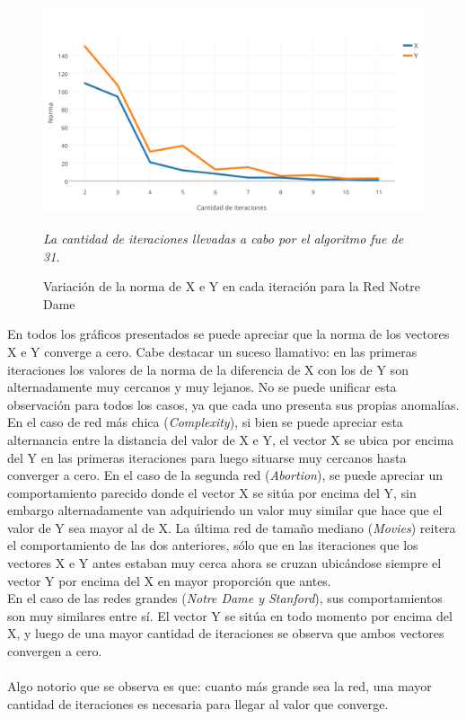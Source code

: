 \documentclass[a4paper]{article}
\begin{document}
\begin{figure}[h!]
  \begin{center}
	\includegraphics[scale=0.50]{imagenes/exp12/notredameHITS.png}
	\caption{Variaci\'on de la norma de X e Y en cada iteraci\'on para la Red Notre Dame}
	\label{nombreparareferenciar}
	\textit{La cantidad de iteraciones llevadas a cabo por el algoritmo fue de 31.}
  \end{center}
\end{figure}
\indent En todos los gr\'aficos presentados se puede apreciar que la norma de los vectores X e Y converge a cero. Cabe destacar un suceso llamativo: en las primeras iteraciones los valores de la norma de la diferencia de X con los de Y son alternadamente muy cercanos y muy lejanos. No se puede unificar esta observaci\'on para todos los casos, ya que cada uno presenta sus propias anomal\'ias. \\
\indent En el caso de red m\'as chica (\emph{Complexity}), si bien se puede apreciar esta alternancia entre la distancia del valor de X e Y, el vector X se ubica por encima del Y en las primeras iteraciones para luego situarse muy cercanos hasta converger a cero. En el caso de la segunda red (\emph{Abortion}), se puede apreciar un comportamiento parecido donde el vector X se sit\'ua por encima del Y, sin embargo alternadamente van adquiriendo un valor muy similar que hace que el valor de Y sea mayor al de X. La \'ultima red de tama\~no mediano (\emph{Movies}) reitera el comportamiento de las dos anteriores, s\'olo que en las iteraciones que los vectores X e Y antes estaban muy cerca ahora se cruzan ubic\'andose siempre el vector Y por encima del X en mayor proporci\'on que antes. \\

\indent En el caso de las redes grandes (\emph{Notre Dame y Stanford}), sus comportamientos son muy similares entre s\'i. El vector Y se sit\'ua en todo momento por encima del X, y luego de una mayor cantidad de iteraciones se observa que ambos vectores convergen a cero.\\
\\
\indent Algo notorio que se observa es que: cuanto m\'as grande sea la red, una mayor cantidad de iteraciones es necesaria para llegar al valor que converge.\\
\newpage
\end{document}
